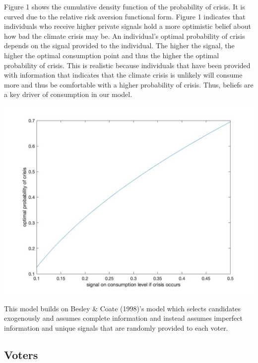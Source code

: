 \documentclass[11pt,preprint, authoryear]{elsarticle}
\let\origfigure\figure
\let\endorigfigure\endfigure
\renewenvironment{figure}[1][2] {
    \expandafter\origfigure\expandafter[H]
} {
    \endorigfigure
}
\numberwithin{equation}{section}
\numberwithin{figure}{section}
\numberwithin{table}{section}
\begin{document}
Figure 1 shows the cumulative density function of the probability of
crisis. It is curved due to the relative risk aversion functional form.
Figure 1 indicates that individuals who receive higher private signals
hold a more optimistic belief about how bad the climate crisis may be.
An individual's optimal probability of crisis depends on the signal
provided to the individual. The higher the signal, the higher the
optimal consumption point and thus the higher the optimal probability of
crisis. This is realistic because individuals that have been provided
with information that indicates that the climate crisis is unlikely will
consume more and thus be comfortable with a higher probability of
crisis. Thus, beliefs are a key driver of consumption in our model.

\begin{figure}[H]

{\centering \includegraphics[width=0.8\linewidth]{images/Figure1base} 

}

\caption{Optimal probability of crisis as mapped from the different beliefs of the optimal consumption level}\label{fig:unnamed-chunk-1}
\end{figure}

This model builds on Besley \& Coate (1998)'s model which selects
candidates exogenously and assumes complete information and instead
assumes imperfect information and unique signals that are randomly
provided to each voter.

\hypertarget{voters}{%
\subsection*{Voters}\label{voters}}
\end{document}
